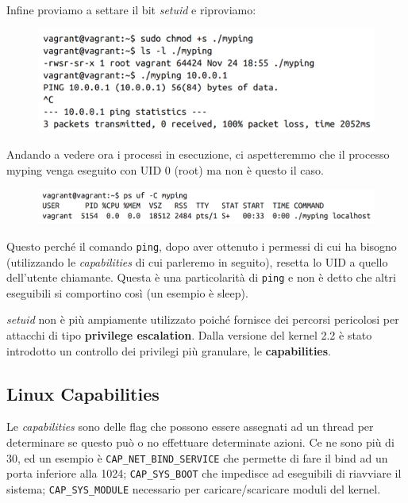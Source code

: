 Infine proviamo a settare il bit \textit{setuid} e riproviamo:

\begin{figure}[H]
    \centering
    \includegraphics[width=\textwidth, keepaspectratio]{capitoli/os_security/imgs/ping3.png}
\end{figure}

Andando a vedere ora i processi in esecuzione, ci aspetteremmo che il processo myping
venga eseguito con UID 0 (root) ma non è questo il caso.

\begin{figure}[H]
    \centering
    \includegraphics[width=\textwidth, keepaspectratio]{capitoli/os_security/imgs/ping4.png}
\end{figure}

Questo perché il comando \verb|ping|, dopo aver ottenuto i permessi di cui ha
bisogno (utilizzando le \textit{capabilities} di cui parleremo in seguito), resetta
lo UID a quello dell'utente chiamante. Questa è una particolarità di \verb|ping|
e non è detto che altri eseguibili si comportino così (un esempio è sleep).

\textit{setuid} non è più ampiamente utilizzato poiché fornisce dei percorsi pericolosi
per attacchi di tipo \textbf{privilege escalation}. Dalla versione del kernel 2.2
è stato introdotto un controllo dei privilegi più granulare, le \textbf{capabilities}.

\subsection{Linux Capabilities}

Le \textit{capabilities} sono delle flag che possono essere assegnati ad un thread
per determinare se questo può o no effettuare determinate azioni. Ce ne sono più
di 30, ed un esempio è \verb|CAP_NET_BIND_SERVICE| che permette di fare il bind
ad un porta inferiore alla 1024; \verb|CAP_SYS_BOOT| che impedisce ad eseguibili
di riavviare il sistema; \verb|CAP_SYS_MODULE| necessario per caricare/scaricare
moduli del kernel.\\

